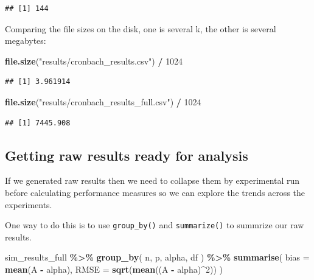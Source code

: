\documentclass[
]{book}
\newenvironment{Shaded}{\begin{snugshade}}{\end{snugshade}}
\newcommand{\AttributeTok}[1]{\textcolor[rgb]{0.13,0.29,0.53}{#1}}
\newcommand{\DecValTok}[1]{\textcolor[rgb]{0.00,0.00,0.81}{#1}}
\newcommand{\FunctionTok}[1]{\textcolor[rgb]{0.13,0.29,0.53}{\textbf{#1}}}
\newcommand{\NormalTok}[1]{#1}
\newcommand{\SpecialCharTok}[1]{\textcolor[rgb]{0.81,0.36,0.00}{\textbf{#1}}}
\newcommand{\StringTok}[1]{\textcolor[rgb]{0.31,0.60,0.02}{#1}}
\begin{document}
\begin{verbatim}
## [1] 144
\end{verbatim}

Comparing the file sizes on the disk, one is several k, the other is several megabytes:

\begin{Shaded}
\begin{Highlighting}[]
\FunctionTok{file.size}\NormalTok{(}\StringTok{"results/cronbach\_results.csv"}\NormalTok{) }\SpecialCharTok{/} \DecValTok{1024}
\end{Highlighting}
\end{Shaded}

\begin{verbatim}
## [1] 3.961914
\end{verbatim}

\begin{Shaded}
\begin{Highlighting}[]
\FunctionTok{file.size}\NormalTok{(}\StringTok{"results/cronbach\_results\_full.csv"}\NormalTok{) }\SpecialCharTok{/} \DecValTok{1024}
\end{Highlighting}
\end{Shaded}

\begin{verbatim}
## [1] 7445.908
\end{verbatim}

\subsection{Getting raw results ready for analysis}\label{getting-raw-results-ready-for-analysis}

If we generated raw results then we need to collapse them by experimental run
before calculating performance measures so we can explore the trends across the
experiments.

One way to do this is to use \texttt{group\_by()} and \texttt{summarize()} to summrize our raw results.

\begin{Shaded}
\begin{Highlighting}[]
\NormalTok{sim\_results\_full }\SpecialCharTok{\%\textgreater{}\%}
    \FunctionTok{group\_by}\NormalTok{( n, p, alpha, df ) }\SpecialCharTok{\%\textgreater{}\%}
  \FunctionTok{summarise}\NormalTok{( }
    \AttributeTok{bias =} \FunctionTok{mean}\NormalTok{(A }\SpecialCharTok{{-}}\NormalTok{ alpha),}
    \AttributeTok{RMSE =} \FunctionTok{sqrt}\NormalTok{(}\FunctionTok{mean}\NormalTok{((A }\SpecialCharTok{{-}}\NormalTok{ alpha)}\SpecialCharTok{\^{}}\DecValTok{2}\NormalTok{))}
\NormalTok{  )}
\end{Highlighting}
\end{Shaded}
\end{document}

